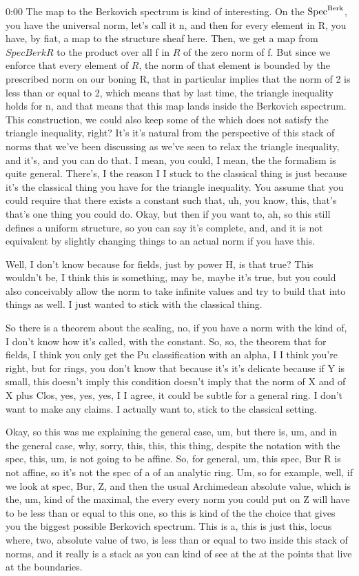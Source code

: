 \begin{unfinished}{0:00}
The map to the Berkovich spectrum is kind of interesting. On the $\operatorname{Spec}^{\mathrm{Berk}}$, you have the universal norm, let's call it n, and then for every element in R, you have, by fiat, a map to the structure sheaf here. Then, we get a map from $Spec Berk R$ to the product over all f in $R$ of the zero norm of f. But since we enforce that every element of $R$, the norm of that element is bounded by the prescribed norm on our boning R, that in particular implies that the norm of 2 is less than or equal to 2, which means that by last time, the triangle inequality holds for n, and that means that this map lands inside the Berkovich sspectrum.
This construction, we could also keep some of the which does not satisfy the triangle inequality, right? It's it's natural from the perspective of this stack of norms that we've been discussing as we've seen to relax the triangle inequality, and it's, and you can do that. I mean, you could, I mean, the the formalism is quite general. There's, I the reason I I stuck to the classical thing is just because it's the classical thing you have for the triangle inequality. You assume that you could require that there exists a constant such that, uh, you know, this, that's that's one thing you could do. Okay, but then if you want to, ah, so this still defines a uniform structure, so you can say it's complete, and, and it is not equivalent by slightly changing things to an actual norm if you have this. 

Well, I don't know because for fields, just by power H, is that true? This wouldn't be, I think this is something, may be, maybe it's true, but you could also conceivably allow the norm to take infinite values and try to build that into things as well. I just wanted to stick with the classical thing.

So there is a theorem about the scaling, no, if you have a norm with the kind of, I don't know how it's called, with the constant. So, so, the theorem that for fields, I think you only get the Pu classification with an alpha, I I think you're right, but for rings, you don't know that because it's it's delicate because if Y is small, this doesn't imply this condition doesn't imply that the norm of X and of X plus Clos, yes, yes, yes, I I agree, it could be subtle for a general ring. I don't want to make any claims. I actually want to, stick to the classical setting.

Okay, so this was me explaining the general case, um, but there is, um, and in the general case, why, sorry, this, this, this thing, despite the notation with the spec, this, um, is not going to be affine. So, for general, um, this spec, Bur R is not affine, so it's not the spec of a of an analytic ring. Um, so for example, well, if we look at spec, Bur, Z, and then the usual Archimedean absolute value, which is the, um, kind of the maximal, the every every norm you could put on Z will have to be less than or equal to this one, so this is kind of the the choice that gives you the biggest possible Berkovich spectrum. This is a, this is just this, locus where, two, absolute value of two, is less than or equal to two inside this stack of norms, and it really is a stack as you can kind of see at the at the points that live at the boundaries.


\end{unfinished}
